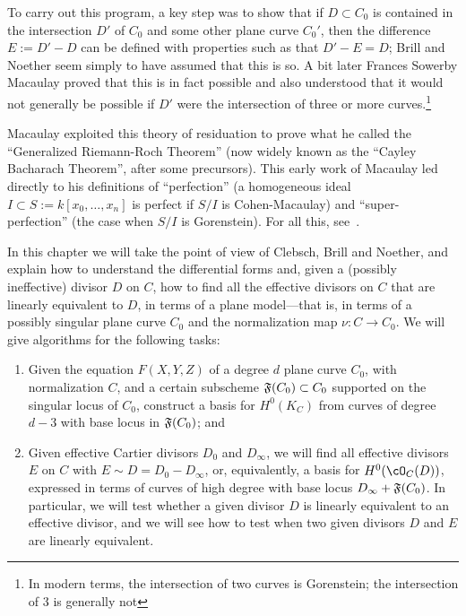 To carry out this program, a key step was to show that if $D\subset C_0$ is contained in the intersection
$D'$ of $C_0$ and some other plane curve $C_0'$, then the difference 
$E := D'-D$ can be defined with properties such as that $D'-E = D$; Brill and Noether seem simply to have assumed that this is so. A bit later Frances Sowerby Macaulay proved that this is in fact possible  and also understood that it would not generally be possible if $D'$ were the intersection of three or more curves.\footnote{In modern terms, the intersection of two curves is Gorenstein; the intersection of 3 is generally not}

Macaulay exploited this theory of residuation  to prove what he called the ``Generalized Riemann-Roch Theorem'' (now widely known as the ``Cayley Bacharach Theorem'', after some precursors). This early work of Macaulay led directly to his definitions of  ``perfection'' (a homogeneous ideal
$I  \subset S:= k[x_0, \dots, x_n]$ is perfect if $S/I$ is Cohen-Macaulay) and ``super-perfection'' (the case when $S/I$ is
Gorenstein). For all this, see~\cite{Eisenbud-Gray}.

In this chapter we will take the point of view of Clebsch, Brill and Noether, and explain how to understand 
the differential forms and, given a (possibly ineffective) divisor $D$ on $C$, how to find all the 
effective divisors on $C$ that are linearly equivalent to $D$, in terms of a plane model---that is, 
in terms of a possibly singular plane curve $C_{0}$ and the normalization map $\nu: C\to C_{0}$.
We will give algorithms for the following tasks:

\begin{enumerate}
\item Given the equation $F(X,Y,Z)$ of a degree $d$ plane curve $C_0$, with normalization $C$,
and a certain subscheme $\adj(C_{0})\subset C_{0}$ supported on the singular locus of $C_{0}$,
construct a basis for $H^0(K_C)$ from curves of degree $d-3$ with base locus in $\adj(C_{0})$; and

\item  Given effective Cartier divisors $D_{0}$ and $D_{\infty}$, we will  find all effective divisors $E$ on $C$ with $E \sim D = D_{0}- D_{\infty}$, or, equivalently, a basis for $H^0(\cO_C(D))$, expressed in terms of curves of high degree with  base locus $D_{\infty}+\adj(C_{0})$. In particular, we will test whether a given divisor $D$ is linearly equivalent to an effective divisor, and we will see how to test when two given divisors $D$ and $E$ are linearly equivalent. 
\end{enumerate}


